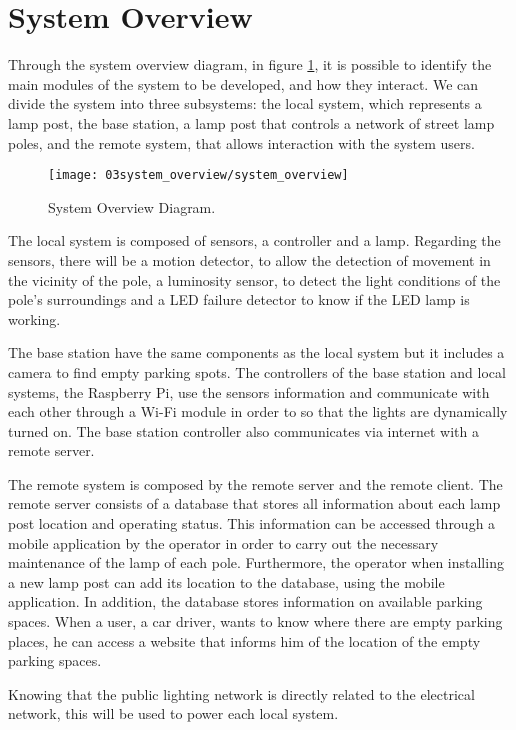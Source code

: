 \section{System Overview}
Through the system overview diagram, in figure \ref{fig:system_overview}, it is possible to identify the main modules of the system to be developed, and how they interact. We can divide the system into three subsystems: the local system, which represents a lamp post, the base station, a lamp post that controls a network of street lamp poles, and the remote system, that allows interaction with the system users.

\begin{figure}[ht]
	\centering
	\texttt{[image: 03system\_overview/system\_overview]}
	\caption{System Overview Diagram.}
	\label{fig:system_overview}
\end{figure}

The local system is composed of sensors, a controller and a lamp. Regarding the sensors, there will be a motion detector, to allow the detection of movement in the vicinity of the pole, a luminosity sensor, to detect the light conditions of the pole’s surroundings and a LED failure detector to know if the LED lamp is working.

The base station have the same components as the local system but it includes a camera to find empty parking spots. The controllers of the base station and local systems, the Raspberry Pi, use the sensors information and communicate with each other through a Wi-Fi module in order to so that the lights are dynamically turned on. The base station controller also communicates via internet with a remote server.

The remote system is composed by the remote server and the remote client. The remote server consists of a database that stores all information about each lamp post location and operating status. This information can be accessed through a mobile application by the operator in order to carry out the necessary maintenance of the lamp of each pole. Furthermore, the operator when installing a new lamp post can add its location to the database, using the mobile application. In addition, the database stores information on available parking spaces. When a user, a car driver, wants to know where there are empty parking places, he can access a website that informs him of the location of the empty parking spaces.

Knowing that the public lighting network is directly related to the electrical network, this will be used to power each local system.

